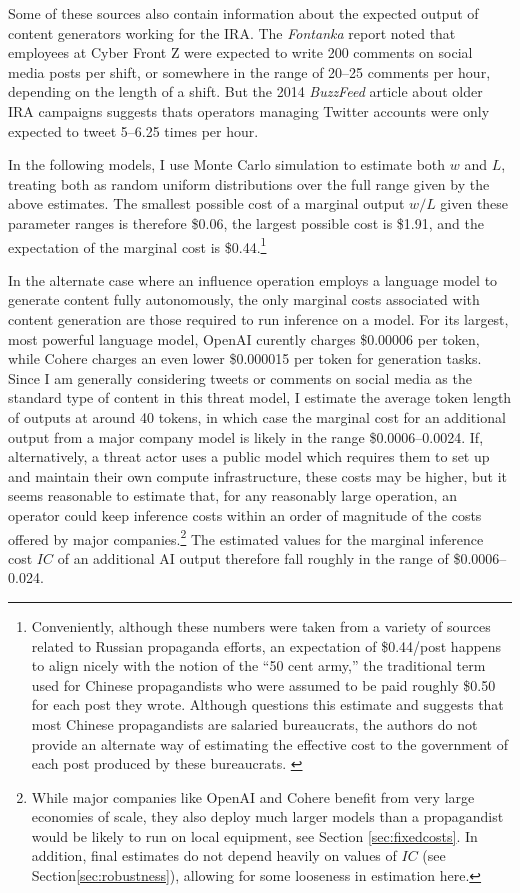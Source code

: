 \documentclass{article}
\begin{document}
Some of these sources also contain information about the expected output of content generators working for the IRA. The \textit{Fontanka} report noted that employees at Cyber Front Z were expected to write 200 comments on social media posts per shift, or somewhere in the range of 20–25 comments per hour, depending on the length of a shift. But the 2014 \textit{BuzzFeed} article about older IRA campaigns suggests thats operators managing Twitter accounts were only expected to tweet 5–6.25 times per hour.   

In the following models, I use Monte Carlo simulation to estimate both $w$ and $L$, treating both as random uniform distributions over the full range given by the above estimates. The smallest possible cost of a marginal output $w/L$ given these parameter ranges is therefore \$0.06, the largest possible cost is \$1.91, and the expectation of the marginal cost is \$0.44.\footnote{Conveniently, although these numbers were taken from a variety of sources related to Russian propaganda efforts, an expectation of \$0.44/post happens to align nicely with the notion of the ``50 cent army,'' the traditional term used for Chinese propagandists who were assumed to be paid roughly \$0.50 for each post they wrote. Although \cite{king} questions this estimate and suggests that most Chinese propagandists are salaried bureaucrats, the authors do not provide an alternate way of estimating the effective cost to the government of each post produced by these bureaucrats. \label{50cent}}

In the alternate case where an influence operation employs a language model to generate content fully autonomously, the only marginal costs associated with content generation are those required to run inference on a model. For its largest, most powerful language model, OpenAI curently charges \$0.00006 per token, while Cohere charges an even lower \$0.000015 per token for generation tasks. \cite{cohereapi, openaiapi} Since I am generally considering tweets or comments on social media as the standard type of content in this threat model, I estimate the average token length of outputs at around 40 tokens, in which case the marginal cost for an additional output from a major company model is likely in the range \$0.0006–0.0024. If, alternatively, a threat actor uses a public model which requires them to set up and maintain their own compute infrastructure, these costs may be higher, but it seems reasonable to estimate that, for any reasonably large operation, an operator could keep inference costs within an order of magnitude of the costs offered by major companies.\footnote{While major companies like OpenAI and Cohere benefit from very large economies of scale, they also deploy much larger models than a propagandist would be likely to run on local equipment, see Section \ref{sec:fixedcosts}. In addition, final estimates do not depend heavily on values of $IC$ (see Section\ref{sec:robustness}), allowing for some looseness in estimation here.} The estimated values for the marginal inference cost $IC$ of an additional AI output therefore fall roughly in the range of \$0.0006–0.024. 
\end{document}
